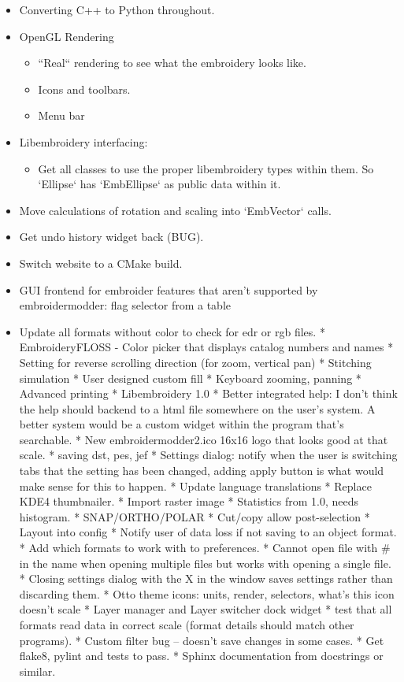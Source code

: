 \documentclass[10pt]{report}
\begin{document}
\begin{itemize}
\item Converting C++ to Python throughout.
\item OpenGL Rendering
\begin{itemize}
  \item ``Real`` rendering to see what the embroidery looks like.
  \item Icons and toolbars.
  \item Menu bar
\end{itemize}
\item Libembroidery interfacing:
\begin{itemize}
  \item Get all classes to use the proper libembroidery types within them. So `Ellipse` has `EmbEllipse` as public data within it.
\end{itemize}
\item Move calculations of rotation and scaling into `EmbVector` calls.
\item Get undo history widget back (BUG).
\item Switch website to a CMake build.
\item GUI frontend for embroider features that aren't supported by embroidermodder: flag selector from a table
\item Update all formats without color to check for edr or rgb files.
* EmbroideryFLOSS - Color picker that displays catalog numbers and names
* Setting for reverse scrolling direction (for zoom, vertical pan)
* Stitching simulation
* User designed custom fill
* Keyboard zooming, panning
* Advanced printing
* Libembroidery 1.0
* Better integrated help: I don't think the help should backend to a html file somewhere on the user's system. A better system would be a custom widget within the program that's searchable.
* New embroidermodder2.ico 16x16 logo that looks good at that scale.
* saving dst, pes, jef
* Settings dialog: notify when the user is switching tabs that the setting has been changed, adding apply button is what would make sense for this to happen.
* Update language translations
* Replace KDE4 thumbnailer.
* Import raster image
* Statistics from 1.0, needs histogram.
* SNAP/ORTHO/POLAR
* Cut/copy allow post-selection
* Layout into config
* Notify user of data loss if not saving to an object format.
* Add which formats to work with to preferences.
* Cannot open file with \# in the name when opening multiple files but works with opening a single file.
* Closing settings dialog with the X in the window saves settings rather than discarding them.
* Otto theme icons: units, render, selectors, what's this icon doesn't scale
* Layer manager and Layer switcher dock widget
* test that all formats read data in correct scale (format details should match other programs).
* Custom filter bug -- doesn't save changes in some cases.
* Get flake8, pylint and tests to pass.
* Sphinx documentation from docstrings or similar.
\end{itemize}
\end{document}
